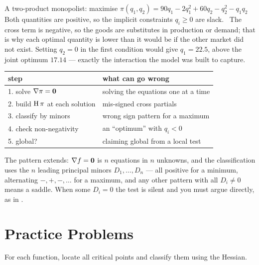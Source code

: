 \begin{worked}{A two-product monopolist: maximise $\pi(q_{1},q_{2})=90q_{1}-2q_{1}^{2}+60q_{2}-q_{2}^{2}-q_{1}q_{2}$}
Both quantities are positive, so the implicit constraints $q_{i}\ge0$ are
slack. \checkmark\ The cross term is negative, so the goods are
substitutes in production or demand; that is why each optimal quantity is
lower than it would be if the other market did not exist. Setting $q_{2}=0$
in the first condition would give $q_{1}=22.5$, above the joint optimum
$17.14$ --- exactly the interaction the model was built to capture.

\begin{center}\footnotesize
\begin{tabular}{ll}
  \hline
  step & what can go wrong\\
  \hline
  1. solve $\nabla\pi=\mathbf 0$ & solving the equations one at a time\\
  2. build $\operatorname{H}\pi$ at each solution & mis-signed cross partials\\
  3. classify by minors & wrong sign pattern for a maximum\\
  4. check non-negativity & an ``optimum'' with $q_{i}<0$\\
  5. global? & claiming global from a local test\\
  \hline
\end{tabular}
\end{center}

The pattern extends: $\nabla f=\mathbf 0$ is $n$ equations in $n$ unknowns,
and the classification uses the $n$ leading principal minors
$D_{1},\dots,D_{n}$ --- all positive for a minimum, alternating
$-,+,-,\dots$ for a maximum, and any other pattern with all $D_{i}\neq0$
means a saddle. When some $D_{i}=0$ the test is silent and you must argue
directly, as in .
\end{worked}

\section{Practice Problems}

For each function, locate all critical points and classify them using the
Hessian.

